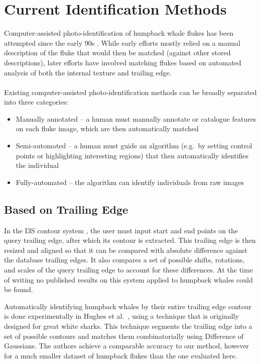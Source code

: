 
\section{Current Identification Methods}

Computer-assisted photo-identification of humpback whale flukes has been attempted since the early 90s \cite{mizroch1990computer}.
While early efforts mostly relied on a manual description of the fluke that would then be matched (against other stored descriptions), later efforts have involved matching flukes based on automated analysis of both the internal texture and trailing edge.
\\\\
Existing computer-assisted photo-identification methods can be broadly separated into three categories:

\begin{itemize}
	\item Manually annotated -- a human must manually annotate or catalogue features on each fluke image, which are then automatically matched
	\item Semi-automated -- a human must guide an algorithm (e.g.\ by setting control points or highlighting interesting regions) that then automatically identifies the individual
	\item Fully-automated -- the algorithm can identify individuals from raw images
\end{itemize}

\subsection{Based on Trailing Edge}

In the I3S contour system \cite{i3scontour}, the user must input start and end points on the query trailing edge, after which its contour is extracted.
This trailing edge is then resized and aligned so that it can be compared with absolute difference against the database trailing edges.
It also compares a set of possible shifts, rotations, and scales of the query trailing edge to account for these differences.
At the time of writing no published results on this system applied to humpback whales could be found.

Automatically identifying humpback whales by their entire trailing edge contour is done experimentally in Hughes et al.\ \cite{hughes2015automated}, using a technique that is originally designed for great white sharks. 
This technique segments the trailing edge into a set of possible contours and matches them combinatorially using Difference of Gaussians.
The authors achieve a comparable accuracy to our method, however for a much smaller dataset of humpback flukes than the one evaluated here.

